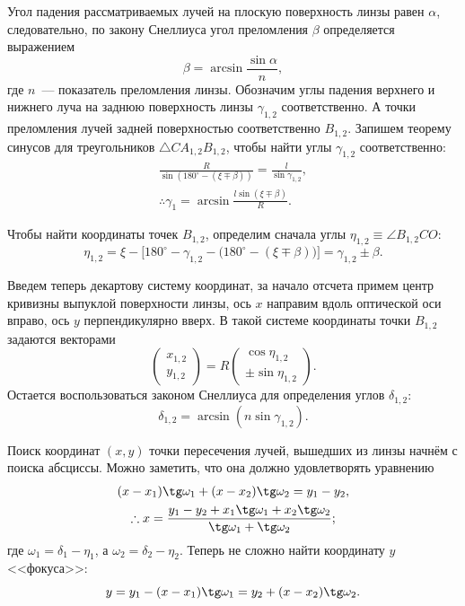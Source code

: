 Угол падения рассматриваемых лучей на плоскую поверхность линзы равен $\alpha$, следовательно, по закону Снеллиуса угол преломления $\beta$ определяется выражением
\begin{equation*}
	\beta = \arcsin \frac{\sin \alpha}{n},
\end{equation*}
где $n$~--- показатель преломления линзы. Обозначим углы падения верхнего и нижнего луча на заднюю поверхность линзы $\gamma_{1,2}$ соответственно. А точки преломления лучей задней поверхностью соответственно $B_{1,2}$. Запишем теорему синусов для треугольников $\triangle C A_{1,2} B_{1,2}$, чтобы найти углы $\gamma_{1,2}$ соответственно:
\begin{gather*}
	\frac{R}{\sin (180^\circ - (\xi \mp \beta))} = \frac{l}{\sin \gamma_{1,2}},\\
	\therefore \gamma_1 = \arcsin \frac{l\sin (\xi \mp \beta)}{R}.
\end{gather*}

Чтобы найти координаты точек $B_{1,2}$, определим сначала углы $ \eta_{1,2} \equiv \angle B_{1,2} C O$:
\begin{equation*}
	\eta_{1,2} = \xi - \Big[180^\circ - \gamma_{1,2} - \big(180^\circ - \left(\xi \mp \beta\right)\big)\Big] = \gamma_{1,2} \pm \beta.
\end{equation*}

Введем теперь декартову систему координат, за начало отсчета примем центр кривизны выпуклой поверхности линзы, ось $x$ направим вдоль оптической оси вправо, ось $y$ перпендикулярно вверх. В такой системе координаты точки $B_{1,2}$ задаются векторами
\begin{equation*}
	\begin{pmatrix}
		x_{1,2}\\
		y_{1,2}
	\end{pmatrix}
	= R
	\begin{pmatrix}
		\cos \eta_{1,2}\\
		\pm \sin \eta_{1,2}
	\end{pmatrix}.
\end{equation*}
Остается воспользоваться законом Снеллиуса для определения углов $\delta_{1,2}$:
\begin{equation*}
	\delta_{1,2} = \arcsin \left( n \sin \gamma_{1,2} \right).
\end{equation*}

Поиск координат  $(x,y)$ точки пересечения лучей, вышедших из линзы начнём с поиска абсциссы. Можно заметить, что она должно удовлетворять уравнению
\begin{gather*}
	(x - x_1) \tg \omega_1 + (x - x_2) \tg \omega_2 = y_1 - y_2,\\
	\therefore x = \frac{y_1 - y_2 + x_1\tg \omega_1 + x_2 \tg \omega_2}{\tg \omega_1 + \tg \omega_2};
\end{gather*}
где $\omega_1 = \delta_1 - \eta_1$, а $\omega_2 = \delta_2 - \eta_2$. Теперь не сложно найти координату $y$ <<фокуса>>:
\begin{equation*}
	y = y_1 - (x - x_1) \tg \omega_1 = y_2 + (x - x_2) \tg \omega_2.
\end{equation*}

